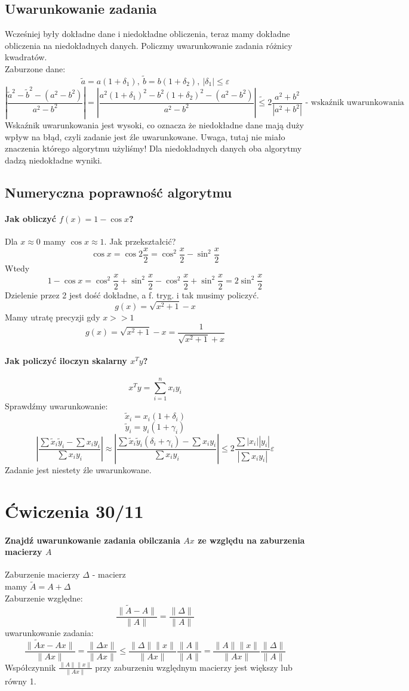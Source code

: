 \documentclass{article}
\begin{document}
\subsection{Uwarunkowanie zadania}
Wcześniej były dokładne dane i niedokładne obliczenia, teraz mamy dokładne obliczenia na niedokładnych danych. Policzmy uwarunkowanie zadania różnicy kwadratów.\\
Zaburzone dane:
$$\tilde{a}=a(1+\delta_1),\ \tilde{b}=b(1+\delta_2), \ |\delta_1|\le\varepsilon$$
$$|\frac{\tilde{a}^2-\tilde{b}^2-(a^2-b^2)}{a^2-b^2}| = |\frac{a^2(1+\delta_1)^2-b^2(1+\delta_2)^2-(a^2-b^2)}{a^2-b^2}| \tilde{\le}2\frac{a^2+b^2}{|a^2+b^2|} 
\text{ - wskaźnik uwarunkowania} $$ 
Wskaźnik uwarunkowania jest wysoki, co oznacza że niedokładne dane mają duży wpływ na błąd, czyli zadanie jest źle uwarunkowane. Uwaga, tutaj nie miało znaczenia którego algorytmu użyliśmy! Dla niedokładnych danych oba algorytmy dadzą niedokładne wyniki.
\subsection{Numeryczna poprawność algorytmu}
\paragraph{Jak obliczyć $ f(x)=1-\cos x $?}
Dla $ x\approx 0 $ mamy $ \cos x\approx 1 $.
Jak przekształcić? $$ \cos x=\cos2\frac x2=\cos^2\frac x2-\sin^2\frac x2 $$ Wtedy 
$$ 1-\cos x= \cos^2\frac x2+\sin^2\frac x2-\cos^2\frac{x}{2}+\sin^2\frac x2=2\sin^2\frac x2$$
Dzielenie przez 2 jest dość dokładne, a f. tryg. i tak musimy policzyć.
$$g(x)=\sqrt{x^2+1}-x$$
Mamy utratę precyzji gdy $ x>>1 $
$$g(x)=\sqrt{x^2+1}-x=\frac1{\sqrt{x^2+1}+x}$$
\paragraph{Jak policzyć iloczyn skalarny $ x^Ty $?}
$$ x^Ty=\sum_{i=1}^n x_iy_i $$
Sprawdźmy uwarunkowanie:
$$\tilde{x}_i=x_i(1+\delta_i)$$
$$\tilde{y}_i=y_i(1+\gamma_i)$$
$$|\frac{\sum\tilde{x}_i\tilde{y}_i-\sum x_iy_i}{\sum x_iy_i}| \approx |\frac{\sum\tilde{x}_i\tilde{y}_i(\delta_i+\gamma_i)-\sum x_iy_i}{\sum x_iy_i}|\le2\frac{\sum|x_i||y_i|}{|\sum x_iy_i|}\varepsilon$$
Zadanie jest niestety źle uwarunkowane.

\section{Ćwiczenia 30/11}
\paragraph{Znajdź uwarunkowanie zadania obilczania $ Ax $ ze względu na zaburzenia macierzy $ A $}
Zaburzenie macierzy $ \Delta $ - macierz\\
mamy $ \tilde{A}=A+\Delta $\\
Zaburzenie względne:
$$\frac{\|\tilde{A}-A\|}{\|A\|}=\frac{\|\Delta\|}{\|A\|}$$
uwarunkowanie zadania:
$$
	\frac{\|\tilde{A}x-Ax\|}{\|Ax\|} =
	\frac{\|\Delta x\|}{\|Ax\|} \le 
	\frac{\|\Delta\|\| x\|}{\|Ax\|}\frac{\|A\|}{\|A\|} =
	\frac{\|A\|\| x\|}{\|Ax\|}\frac{\|\Delta\|}{\|A\|}
$$
Współczynnik $ \frac{\|A\|\| x\|}{\|Ax\|} $ przy zaburzeniu względnym macierzy jest większy lub równy 1.
\end{document}
